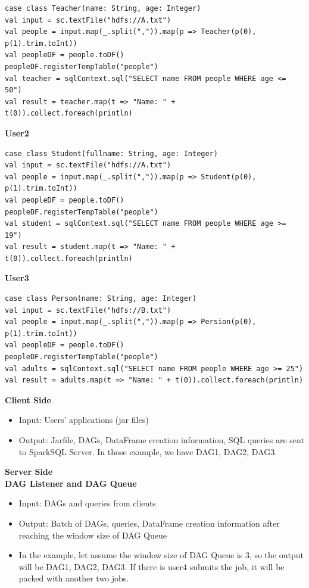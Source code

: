 \begin{lstlisting}
case class Teacher(name: String, age: Integer)
val input = sc.textFile("hdfs://A.txt")
val people = input.map(_.split(",")).map(p => Teacher(p(0), p(1).trim.toInt))
val peopleDF = people.toDF()
peopleDF.registerTempTable("people")
val teacher = sqlContext.sql("SELECT name FROM people WHERE age <= 50")
val result = teacher.map(t => "Name: " + t(0)).collect.foreach(println)
\end{lstlisting}

\textbf{User2}

\begin{lstlisting}
case class Student(fullname: String, age: Integer)
val input = sc.textFile("hdfs://A.txt")
val people = input.map(_.split(",")).map(p => Student(p(0), p(1).trim.toInt))
val peopleDF = people.toDF()
peopleDF.registerTempTable("people")
val student = sqlContext.sql("SELECT name FROM people WHERE age >= 19")
val result = student.map(t => "Name: " + t(0)).collect.foreach(println)
\end{lstlisting}

\textbf{User3}

\begin{lstlisting}
case class Person(name: String, age: Integer)
val input = sc.textFile("hdfs://B.txt")
val people = input.map(_.split(",")).map(p => Persion(p(0), p(1).trim.toInt))
val peopleDF = people.toDF()
peopleDF.registerTempTable("people")
val adults = sqlContext.sql("SELECT name FROM people WHERE age >= 25")
val result = adults.map(t => "Name: " + t(0)).collect.foreach(println)
\end{lstlisting}

\textbf{Client Side}
\begin{itemize}
\item Input: Users’ applications (jar files)
\item Output: Jarfile, DAGs, DataFrame creation information, SQL queries are sent to SparkSQL Server. In those example, we have DAG1, DAG2, DAG3.
\end{itemize}

\textbf{Server Side}\\
\textbf{DAG Listener and DAG Queue}
\begin{itemize}
\item Input: DAGs and queries from clients
\item Output: Batch of DAGs, queries, DataFrame creation information after reaching the window size of DAG Queue
\item In the example, let assume the window size of DAG Queue is 3, so the output will be DAG1, DAG2, DAG3. If there is user4 submits the job, it will be packed with another two jobs.
\end{itemize}

